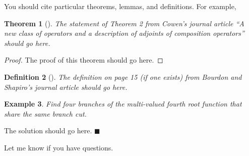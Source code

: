 \documentclass{article}
\newtheorem{theorem}{Theorem}
\newtheorem{definition}[theorem]{Definition}
\newtheorem{example}[theorem]{Example}
\newenvironment{solution}{\noindent{\textit{Solution.}}}{\hfill$\blacksquare$}
\begin{document}
You should cite particular theorems, lemmas, and definitions. For example,
\begin{theorem}[{\cite[Theorem 2]{cowen06}}]
The statement of Theorem 2 from Cowen's journal article ``A new class of operators and a description of adjoints of composition operators'' should go here.
\end{theorem}
\begin{proof}
The proof of this theorem should go here.
\end{proof}

\begin{definition}[{\cite[p. 15]{bourdon08}}]
The definition on page 15 (if one exists) from Bourdon and Shapiro's journal article should go here. 
\end{definition}

\begin{example}
Find four branches of the multi-valued fourth root function that share the same branch cut.
\end{example}
\begin{solution}
The solution should go here.
\end{solution}

Let me know if you have questions.



\newpage

\end{document}
